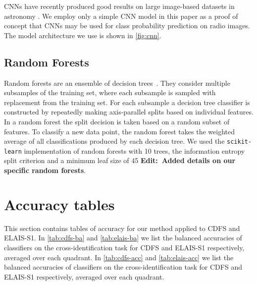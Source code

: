 \documentclass[fleqn,usenatbib,usedcolumn]{mnras}
\newcommand{\edit}[1]{{\bf Edit:~{#1}}}
\begin{document}
    CNNs have recently produced good results on large image-based datasets in astronomy \citep[e.g.][; Lukic et al. in prep]{dieleman15cnn}. We employ only a simple CNN model in this paper as a proof of concept that CNNs may be used for class probability prediction on radio images. The model architecture we use is shown in \autoref{fig:cnn}.

  \subsection{Random Forests}
  \label{sec:random-forests}

    Random forests are an ensemble of decision trees~\citep{breiman01random-forest}. They consider multiple subsamples of the training set, where each subsample is sampled with replacement from the training set. For each subsample a decision tree classifier is constructed by repeatedly making axis-parallel splits based on individual features. In a random forest the split decision is taken based on a random subset of features. To classify a new data point, the random forest takes the weighted average of all classifications produced by each decision tree. We used the \texttt{scikit-learn} \citep{pedregosa11sklearn} implementation of random forests with 10 trees, the information entropy split criterion and a minimum leaf size of 45 \edit{Added details on our specific random forests}.

\section{Accuracy tables}\label{app:accuracies}
  
  This section contains tables of accuracy for our method applied to CDFS and ELAIS-S1. In \autoref{tab:cdfs-ba} and \autoref{tab:elais-ba} we list the balanced accuracies of classifiers on the cross-identification task for CDFS and ELAIS-S1 respectively, averaged over each quadrant. In \autoref{tab:cdfs-acc} and \autoref{tab:elais-acc} we list the balanced accuracies of classifiers on the cross-identification task for CDFS and ELAIS-S1 respectively, averaged over each quadrant.
\end{document}
